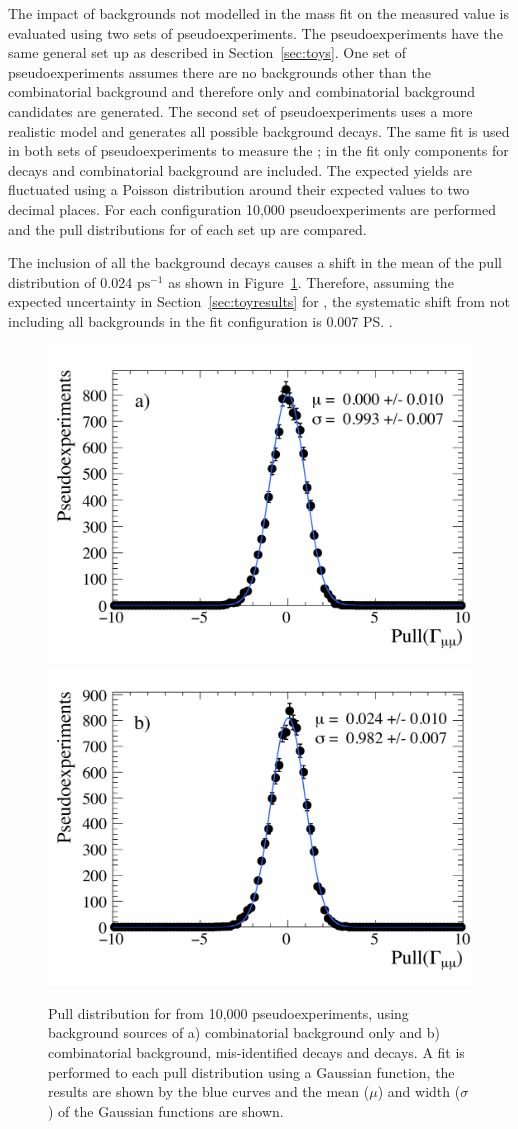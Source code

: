 The impact of backgrounds not modelled in the mass fit on the measured \tmumu value is evaluated using two sets of pseudoexperiments. The pseudoexperiments have the same general set up as described in Section~\ref{sec:toys}. One set of pseudoexperiments assumes there are no backgrounds other than the combinatorial background and therefore only \bsmumu and combinatorial background candidates are generated. The second set of pseudoexperiments uses a more realistic model and generates all possible background decays. The same fit is used in both sets of pseudoexperiments to measure the \bsmumu \el; in the fit only components for \bsmumu decays and combinatorial background are included. The expected yields are fluctuated using a Poisson distribution around their expected values to two decimal places. For each configuration 10,000 pseudoexperiments are performed and the pull distributions for \Gmumu of each set up are compared. %

The inclusion of all the background decays causes a shift in the mean of the \Gmumu pull distribution of 0.024 $\mathrm{ps}^{-1}$ as shown in Figure~\ref{fig:bkdcontam}. Therefore, assuming the expected uncertainty in Section~\ref{sec:toyresults} for \tmumu, the systematic shift from not including all backgrounds in the fit configuration is 0.007 \ps.%

\begin{figure}[tbp]
    \centering
        \includegraphics[width=0.49 \textwidth]{./Figs/LifetimeSystematics/Gamma_pull_mass_pdf_Run1.pdf}
        \includegraphics[width=0.49 \textwidth]{./Figs/LifetimeSystematics/5320_all_bkgnds_gamma_pull_CKM.pdf}
    \caption{Pull distribution for \Gmumu from 10,000 pseudoexperiments, using background sources of a) combinatorial background only and b) combinatorial background, mis-identified decays and \bdmumu decays. A fit is performed to each pull distribution using a Gaussian function, the results are shown by the blue curves and the mean ($\mu$) and width ($\sigma$) of the Gaussian functions are shown.}
    \label{fig:bkdcontam}
\end{figure}

